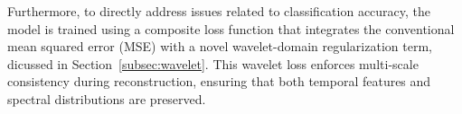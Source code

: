 \documentclass[conference]{IEEEtran}
\begin{document}
Furthermore, to directly address issues related to classification accuracy, the model is trained using a composite loss function that integrates the conventional mean squared error (MSE) with a novel wavelet-domain regularization term, dicussed in Section~\ref{subsec:wavelet}. This wavelet loss enforces multi-scale consistency during reconstruction, ensuring that both temporal features and spectral distributions are preserved. 






\end{document}
